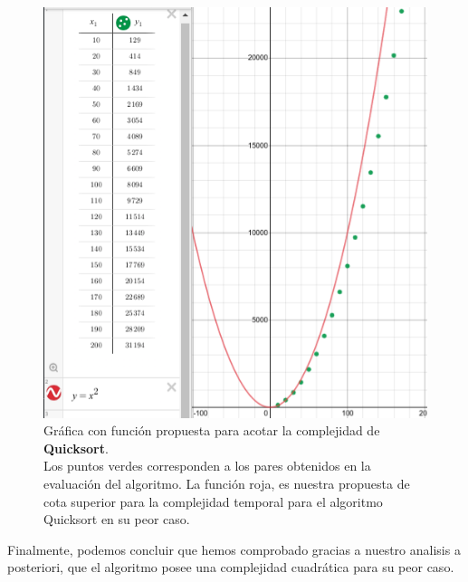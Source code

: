         \begin{figure}[h!]
            \centering
            \includegraphics[width=13cm]{QuickSort/desmos-qsort-ordenado.png}
            \caption{Gráfica con función propuesta para acotar la complejidad de \textbf{Quicksort}. \\Los puntos verdes corresponden a los pares obtenidos en la evaluación del algoritmo. La función roja, es nuestra propuesta de cota superior para la complejidad temporal para el algoritmo Quicksort en su peor caso.}
            \label{GraficaDesmosPartition}
        \end{figure}
        
        Finalmente, podemos concluir que hemos comprobado gracias a nuestro analisis a posteriori, que el algoritmo posee una complejidad cuadrática para su peor caso.
        
